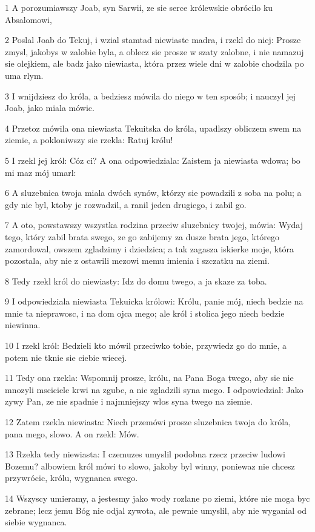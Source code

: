 \par 1 A porozumiawszy Joab, syn Sarwii, ze sie serce królewskie obrócilo ku Absalomowi,
\par 2 Poslal Joab do Tekuj, i wzial stamtad niewiaste madra, i rzekl do niej: Prosze zmysl, jakobys w zalobie byla, a oblecz sie prosze w szaty zalobne, i nie namazuj sie olejkiem, ale badz jako niewiasta, która przez wiele dni w zalobie chodzila po uma rlym.
\par 3 I wnijdziesz do króla, a bedziesz mówila do niego w ten sposób; i nauczyl jej Joab, jako miala mówic.
\par 4 Przetoz mówila ona niewiasta Tekuitska do króla, upadlszy obliczem swem na ziemie, a pokloniwszy sie rzekla: Ratuj królu!
\par 5 I rzekl jej król: Cóz ci? A ona odpowiedziala: Zaistem ja niewiasta wdowa; bo mi maz mój umarl:
\par 6 A sluzebnica twoja miala dwóch synów, którzy sie powadzili z soba na polu; a gdy nie byl, ktoby je rozwadzil, a ranil jeden drugiego, i zabil go.
\par 7 A oto, powstawszy wszystka rodzina przeciw sluzebnicy twojej, mówia: Wydaj tego, który zabil brata swego, ze go zabijemy za dusze brata jego, którego zamordowal, owszem zgladzimy i dziedzica; a tak zagasza iskierke moje, która pozostala, aby nie z ostawili mezowi memu imienia i szczatku na ziemi.
\par 8 Tedy rzekl król do niewiasty: Idz do domu twego, a ja skaze za toba.
\par 9 I odpowiedziala niewiasta Tekuicka królowi: Królu, panie mój, niech bedzie na mnie ta nieprawosc, i na dom ojca mego; ale król i stolica jego niech bedzie niewinna.
\par 10 I rzekl król: Bedzieli kto mówil przeciwko tobie, przywiedz go do mnie, a potem nie tknie sie ciebie wiecej.
\par 11 Tedy ona rzekla: Wspomnij prosze, królu, na Pana Boga twego, aby sie nie mnozyli msciciele krwi na zgube, a nie zgladzili syna mego. I odpowiedzial: Jako zywy Pan, ze nie spadnie i najmniejszy wlos syna twego na ziemie.
\par 12 Zatem rzekla niewiasta: Niech przemówi prosze sluzebnica twoja do króla, pana mego, slowo. A on rzekl: Mów.
\par 13 Rzekla tedy niewiasta: I czemuzes umyslil podobna rzecz przeciw ludowi Bozemu? albowiem król mówi to slowo, jakoby byl winny, poniewaz nie chcesz przywrócic, królu, wygnanca swego.
\par 14 Wszyscy umieramy, a jestesmy jako wody rozlane po ziemi, które nie moga byc zebrane; lecz jemu Bóg nie odjal zywota, ale pewnie umyslil, aby nie wyganial od siebie wygnanca.
